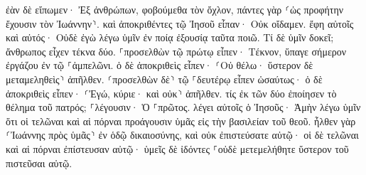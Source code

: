 \documentclass{openreader}
\begin{document}
ἐὰν δὲ εἴπωμεν· Ἐξ ἀνθρώπων, φοβούμεθα τὸν ὄχλον, πάντες γὰρ ⸂ὡς προφήτην ἔχουσιν τὸν Ἰωάννην⸃. 
καὶ ἀποκριθέντες τῷ Ἰησοῦ εἶπαν· Οὐκ οἴδαμεν. ἔφη αὐτοῖς καὶ αὐτός· Οὐδὲ ἐγὼ λέγω ὑμῖν ἐν ποίᾳ ἐξουσίᾳ ταῦτα ποιῶ. 
Τί δὲ ὑμῖν δοκεῖ; ἄνθρωπος εἶχεν τέκνα δύο. ⸀προσελθὼν τῷ πρώτῳ εἶπεν· Τέκνον, ὕπαγε σήμερον ἐργάζου ἐν τῷ ⸀ἀμπελῶνι. 
ὁ δὲ ἀποκριθεὶς εἶπεν· ⸂Οὐ θέλω· ὕστερον δὲ μεταμεληθεὶς⸃ ἀπῆλθεν. 
⸂προσελθὼν δὲ⸃ τῷ ⸀δευτέρῳ εἶπεν ὡσαύτως· ὁ δὲ ἀποκριθεὶς εἶπεν· ⸂Ἐγώ, κύριε· καὶ οὐκ⸃ ἀπῆλθεν. 
τίς ἐκ τῶν δύο ἐποίησεν τὸ θέλημα τοῦ πατρός; ⸀λέγουσιν· Ὁ ⸀πρῶτος. λέγει αὐτοῖς ὁ Ἰησοῦς· Ἀμὴν λέγω ὑμῖν ὅτι οἱ τελῶναι καὶ αἱ πόρναι προάγουσιν ὑμᾶς εἰς τὴν βασιλείαν τοῦ θεοῦ. 
ἦλθεν γὰρ ⸂Ἰωάννης πρὸς ὑμᾶς⸃ ἐν ὁδῷ δικαιοσύνης, καὶ οὐκ ἐπιστεύσατε αὐτῷ· οἱ δὲ τελῶναι καὶ αἱ πόρναι ἐπίστευσαν αὐτῷ· ὑμεῖς δὲ ἰδόντες ⸀οὐδὲ μετεμελήθητε ὕστερον τοῦ πιστεῦσαι αὐτῷ. 
\end{document}
